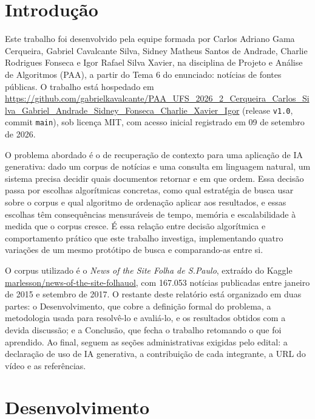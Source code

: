 \documentclass[12pt, a4paper]{article}
\begin{document}
\newpage
\tableofcontents
\thispagestyle{empty}
\newpage

\setcounter{page}{1}

\section{Introdução}

Este trabalho foi desenvolvido pela equipe formada por Carlos Adriano Gama Cerqueira, Gabriel Cavalcante Silva, Sidney Matheus Santos de Andrade, Charlie Rodrigues Fonseca e Igor Rafael Silva Xavier, na disciplina de Projeto e Análise de Algoritmos (PAA), a partir do Tema 6 do enunciado: notícias de fontes públicas. O trabalho está hospedado em \url{https://github.com/gabrielkavalcante/PAA_UFS_2026_2_Cerqueira_Carlos_Silva_Gabriel_Andrade_Sidney_Fonseca_Charlie_Xavier_Igor} (release \texttt{v1.0}, commit \texttt{main}), sob licença MIT, com acesso inicial registrado em 09 de setembro de 2026.

O problema abordado é o de recuperação de contexto para uma aplicação de IA generativa: dado um corpus de notícias e uma consulta em linguagem natural, um sistema precisa decidir quais documentos retornar e em que ordem. Essa decisão passa por escolhas algorítmicas concretas, como qual estratégia de busca usar sobre o corpus e qual algoritmo de ordenação aplicar aos resultados, e essas escolhas têm consequências mensuráveis de tempo, memória e escalabilidade à medida que o corpus cresce. É essa relação entre decisão algorítmica e comportamento prático que este trabalho investiga, implementando quatro variações de um mesmo protótipo de busca e comparando-as entre si.

O corpus utilizado é o \textit{News of the Site Folha de S.Paulo}, extraído do Kaggle \url{marlesson/news-of-the-site-folhauol}, com 167.053 notícias publicadas entre janeiro de 2015 e setembro de 2017. O restante deste relatório está organizado em duas partes: o Desenvolvimento, que cobre a definição formal do problema, a metodologia usada para resolvê-lo e avaliá-lo, e os resultados obtidos com a devida discussão; e a Conclusão, que fecha o trabalho retomando o que foi aprendido. Ao final, seguem as seções administrativas exigidas pelo edital: a declaração de uso de IA generativa, a contribuição de cada integrante, a URL do vídeo e as referências.

\section{Desenvolvimento}
\end{document}
